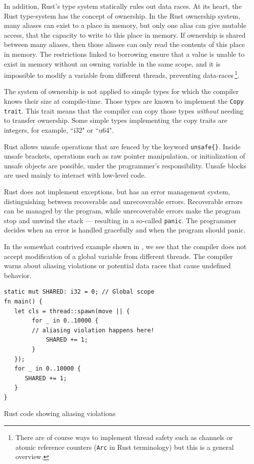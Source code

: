 \documentclass[nomenclature, english, bibtex]{kththesis}
\begin{document}
In addition, Rust’s type system statically rules out data races. At its heart, the Rust type-system has the concept of ownership. In the Rust ownership system, many aliases can exist to a place in memory, but only one alias can give mutable access, that the capacity to write to this place in memory. If ownership is shared between many aliases, then those aliases can only read the contents of this place in memory. The restrictions linked to borrowing ensure that a value is unable to exist in memory without an owning variable in the same scope, and it is impossible to modify a variable from different threads, preventing data-races\,\cite{poveda_ruiz_bounded_2019,noauthor_rust_nodate}\footnote{There are of course ways to implement thread safety such as channels or atomic reference counters (\texttt{Arc} in Rust terminology) but this is a general overview.}. 

The system of ownership is not applied to simple types for which the compiler knows their size at compile-time. Those types are known to implement the \texttt{Copy trait}. This trait means that the compiler can copy those types \emph{without} needing to transfer ownership. Some simple types implementing the copy traits are integers, for example, ``i32" or ``u64".

Rust allows unsafe operations that are fenced by the keyword \texttt{unsafe\{\}}. Inside unsafe brackets, operations such as raw pointer manipulation, or initialization of unsafe objects are possible, under the programmer's responsibility. Unsafe blocks are used mainly to interact with low-level code.

Rust does not implement exceptions, but has an error management system, distinguishing between recoverable and unrecoverable errors. Recoverable errors can be managed by the program, while unrecoverable errors make the program stop and unwind the stack --- resulting in a so-called \texttt{panic}. The programmer decides when an error is handled gracefully and when the program should panic.

In the somewhat contrived  example shown in , we see that the compiler does not accept modification of a global variable from different threads. The compiler warns about aliasing violations or potential data races that cause undefined behavior.
\begin{listing}[!ht]
\begin{verbatim}
static mut SHARED: i32 = 0; // Global scope
fn main() {
   let cls = thread::spawn(move || {
        for _ in 0..10000 {
        // aliasing violation happens here!
            SHARED += 1;
        }
   });
   for _ in 0..10000 {
      SHARED += 1;
   }
}
\end{verbatim}
\caption[Rust code showing aliasing violations]{Rust code showing aliasing violations}
\label{lstlisting:data_race}
\end{listing}
\FloatBarrier
\end{document}
